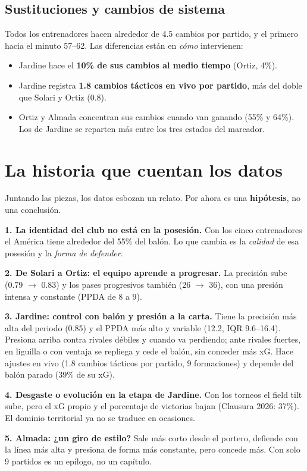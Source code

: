 \documentclass[11pt,a4paper]{article}
\begin{document}
\subsection{Sustituciones y cambios de sistema}


Todos los entrenadores hacen alrededor de 4.5 cambios por partido, y el primero hacia el minuto 57--62. Las diferencias están en \emph{cómo} intervienen:
\begin{itemize}
  \item Jardine hace el \textbf{10\% de sus cambios al medio tiempo} (Ortiz, 4\%).
  \item Jardine registra \textbf{1.8 cambios tácticos en vivo por partido}, más del doble que Solari y Ortiz (0.8).
  \item Ortiz y Almada concentran sus cambios cuando van ganando (55\% y 64\%). Los de Jardine se reparten más entre los tres estados del marcador.
\end{itemize}

\section{La historia que cuentan los datos}\label{sec:historia}
Juntando las piezas, los datos esbozan un relato. Por ahora es una \textbf{hipótesis}, no una conclusión.

\begin{historia}
\textbf{1. La identidad del club no está en la posesión.} Con los cinco entrenadores el América tiene alrededor del 55\% del balón. Lo que cambia es la \emph{calidad} de esa posesión y la \emph{forma de defender}.

\textbf{2. De Solari a Ortiz: el equipo aprende a progresar.} La precisión sube (0.79 $\to$ 0.83) y los pases progresivos también (26 $\to$ 36), con una presión intensa y constante (PPDA de 8 a 9).

\textbf{3. Jardine: control con balón y presión a la carta.} Tiene la precisión más alta del periodo (0.85) y el PPDA más alto y variable (12.2, IQR 9.6--16.4). Presiona arriba contra rivales débiles y cuando va perdiendo; ante rivales fuertes, en liguilla o con ventaja se repliega y cede el balón, sin conceder más xG. Hace ajustes en vivo (1.8 cambios tácticos por partido, 9 formaciones) y depende del balón parado (39\% de su xG).

\textbf{4. Desgaste o evolución en la etapa de Jardine.} Con los torneos el field tilt sube, pero el xG propio y el porcentaje de victorias bajan (Clausura 2026: 37\%). El dominio territorial ya no se traduce en ocasiones.

\textbf{5. Almada: ¿un giro de estilo?} Sale más corto desde el portero, defiende con la línea más alta y presiona de forma más constante, pero concede más. Con solo 9 partidos es un epílogo, no un capítulo.
\end{historia}
\end{document}
